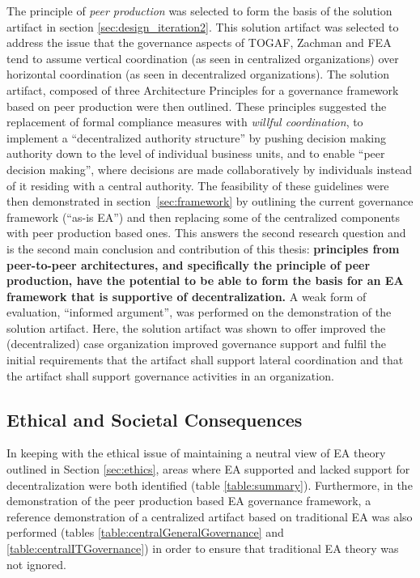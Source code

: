 The principle of \textit{peer production} was selected to form the basis of the solution artifact in section \ref{sec:design_iteration2}. This solution artifact was selected to address the issue that the governance aspects of TOGAF, Zachman and FEA tend to assume vertical coordination (as seen in centralized organizations) over horizontal coordination (as seen in decentralized organizations). The solution artifact, composed of three Architecture Principles for a governance framework based on peer production were then outlined. These principles suggested the replacement of formal compliance measures with \textit{willful coordination}, to implement a ``decentralized authority structure'' by pushing decision making authority down to the level of individual business units, and to enable ``peer decision making'', where decisions are made collaboratively by individuals instead of it residing with a central authority. The feasibility of these guidelines were then demonstrated in section~\ref{sec:framework} by outlining the current governance framework (``as-is EA'') and then replacing some of the centralized components with peer production based ones. This answers the second research question and is the second main conclusion and contribution of this thesis: \textbf{principles from peer-to-peer architectures, and specifically the principle of peer production, have the potential to be able to form the basis for an EA framework that is supportive of decentralization.} A weak form of evaluation, ``informed argument'', was performed on the demonstration of the solution artifact. Here, the solution artifact was shown to offer improved the (decentralized) case organization improved governance support and fulfil the initial requirements that the artifact shall support lateral coordination and that the artifact shall support governance activities in an organization.

\subsection{Ethical and Societal Consequences}

In keeping with the ethical issue of maintaining a neutral view of EA theory outlined in Section \ref{sec:ethics}, areas where EA supported and lacked support for decentralization were both identified (table \ref{table:summary}). Furthermore, in the demonstration of the peer production based EA governance framework, a reference demonstration of a centralized artifact based on traditional EA was also performed (tables \ref{table:centralGeneralGovernance} and \ref{table:centralITGovernance}) in order to ensure that traditional EA theory was not ignored. 

